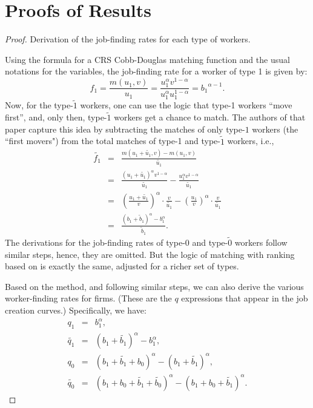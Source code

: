 \documentclass[12pt]{article} %
\theoremstyle{definition}
\begin{document}
\section{Proofs of Results}\label{section appendix proofs}
\begin{proof}{Derivation of the job-finding rates for each type of workers.}

\noindent Using the formula for a CRS Cobb-Douglas matching function and the usual notations for the variables, the job-finding rate for a worker of type 1 is given by: 
\begin{equation*}
     f_1 = \frac{m(u_1,v)}{u_1} =  \frac{u_1^\alpha v^{1-\alpha}}{u_1^\alpha u_1^{1-\alpha}}  = {b_1}^{\alpha-1}.  
\end{equation*}
Now, for the type-$\tilde{1}$ workers, one can use the \cite{petrongolo2001looking} logic that type-1 workers “move first”, and, only then, type-$\tilde{1}$ workers get a chance to match. The authors of that paper capture this idea by subtracting the matches of only type-${1}$ workers (the ``first movers") from the total matches of type-1 and type-$\tilde{1}$ workers, i.e.,  
\begin{eqnarray*}
     \tilde{f_1} &=& \frac{m(u_1+\tilde{u_1},v)-m(u_1,v)}{\tilde{u_1}} \nonumber  \\
      &=& \frac{(u_1+\tilde{u_1})^\alpha v^{1-\alpha}}{\tilde{u_1}} -\frac{u_1^\alpha v^{1-\alpha}}{\tilde{u_1}} \nonumber \\
        &=& \left(\frac{u_1+\tilde{u_1}}{v}\right)^{\alpha} \cdot \frac{v}{\tilde{u_1}} - \left(\frac{u_1}{v}\right)^{\alpha}\cdot  \frac{v}{\tilde{u_1}} \nonumber \\
        &=& \frac{(b_1+\tilde{b}_1)^\alpha - b_1^\alpha}{\tilde{b}_1}.
\end{eqnarray*}The derivations for the job-finding rates of type-0 and type-$\tilde{0}$ workers follow similar steps, hence, they are omitted. But the logic of matching with ranking based on \cite{petrongolo2001looking} is exactly the same, adjusted for a richer set of types. 

Based on the \cite{petrongolo2001looking} method, and following similar steps, we can also derive the various worker-finding rates for firms. (These are the $q$ expressions that appear in the job creation curves.) Specifically, we have:  
\begin{eqnarray*}
q_1 &=& b_1^\alpha,\nonumber \\
\tilde{q_1} &=&  (b_1+\tilde{b_1})^\alpha - b_1^\alpha,\nonumber \\
q_0 &=& (b_1+\tilde{b_1}+b_0)^\alpha - (b_1+\tilde{b_1})^\alpha, \nonumber \\
\tilde{q_0} &=&  (b_1+b_0+\tilde{b_1}+\tilde{b_0})^\alpha - (b_1+b_0+\tilde{b_1})^\alpha.
\end{eqnarray*}
\end{proof}
\end{document}

